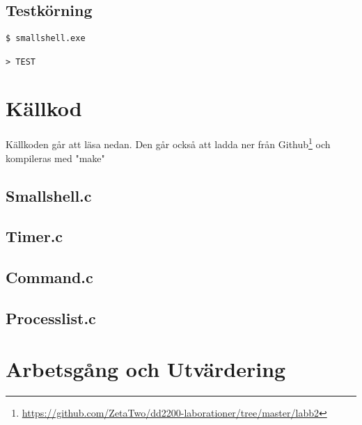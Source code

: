 \documentclass[10pt,a4paper]{article}
\begin{document}

\subsection{Testkörning}

\begin{lstlisting}
$ smallshell.exe

> TEST
\end{lstlisting}


\clearpage
\section{Källkod}
Källkoden går att läsa nedan. Den går också att ladda ner från Github\footnote{\url{https://github.com/ZetaTwo/dd2200-laborationer/tree/master/labb2}} och kompileras med "make"

\subsection{Smallshell.c}

\subsection{Timer.c}

\subsection{Command.c}

\subsection{Processlist.c}

\clearpage

\section{Arbetsgång och Utvärdering}
\end{document}
